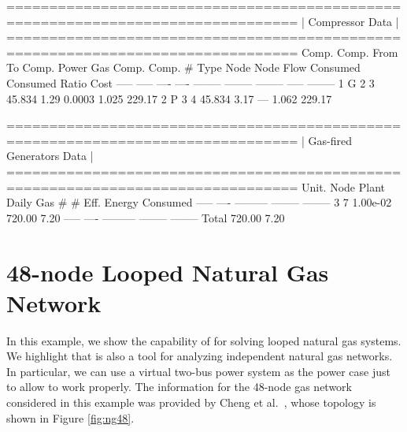\begin{small}
	\begin{Code}	
	================================================================================
	|     Compressor Data                                                          |
	================================================================================
	 Comp.   Comp.   From    To     Comp.      Power       Gas      Comp.    Comp.  
	   #     Type    Node   Node    Flow      Consumed   Consumed   Ratio    Cost   
	 -----   -----   ----   ----   --------   --------   --------   -----   --------
	   1       G       2      3      45.834      1.29     0.0003    1.025   229.17
	   2       P       3      4      45.834      3.17       ---     1.062   229.17
	
	================================================================================
	|     Gas-fired Generators Data                                                |
	================================================================================
	 Unit.   Node   Plant       Daily      Gas                               
	   #      #      Eff.       Energy    Consumed                           
	 -----   ----  ---------   --------   --------                           
	   3      7     1.00e-02     720.00      7.20
	 -----   ----  ---------   --------   --------                           
	                   Total     720.00      7.20   	
\end{Code}
\end{small}

\section{48-node Looped Natural Gas Network}
\label{sec:48_gas}

In this example, we show the capability of \mpng{} for solving looped natural gas systems. We highlight that \mpng{} is also a tool for analyzing independent natural gas networks. In particular, we can use a virtual two-bus power system as the power case just to allow \matpower{} to work properly. The information for the 48-node gas network considered in this example was provided by Cheng et al.~\cite{Chen2017}, whose topology is shown in Figure \ref{fig:ng48}.\\

